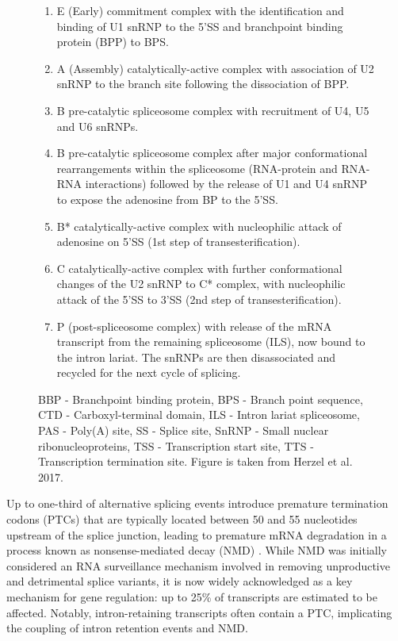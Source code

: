 \begin{figure}[!htp]
{\begin{enumerate}
			\item E (Early) commitment complex with the identification and binding of U1 snRNP to the 5'SS and branchpoint binding protein (BPP) to BPS.
			\item A (Assembly) catalytically-active complex with association of U2 snRNP to the branch site following the dissociation of BPP. 
			\item B pre-catalytic spliceosome complex with recruitment of U4, U5 and U6 snRNPs.
			\item B pre-catalytic spliceosome complex after major conformational rearrangements within the spliceosome (RNA-protein and RNA-RNA interactions) followed by the release of U1 and U4 snRNP to expose the adenosine from BP to the 5'SS. 
			\item B* catalytically-active complex with nucleophilic attack of adenosine on 5'SS (1st step of transesterification). 
			\item C catalytically-active complex with further conformational changes of the U2 snRNP to C* complex, with nucleophilic attack of the 5'SS to 3'SS (2nd step of transesterification). 
			\item P (post-spliceosome complex) with release of the mRNA transcript from the remaining spliceosome (ILS), now bound to the intron lariat. The snRNPs are then disassociated and recycled for the next cycle of splicing.
			\\
		\end{enumerate} 
		BBP - Branchpoint binding protein, BPS - Branch point sequence, CTD - Carboxyl-terminal domain, ILS - Intron lariat spliceosome, PAS - Poly(A) site, SS - Splice site, SnRNP - Small nuclear ribonucleoproteins, TSS - Transcription start site, TTS - Transcription termination site. Figure is taken from Herzel et al. 2017\cite{Herzel2017}.
	}
	\label{fig:AS_mechanism}
\end{figure}

\newpage
{}
Up to one-third of alternative splicing events introduce premature termination codons (PTCs) that are typically located between 50 and 55 nucleotides upstream of the splice junction, leading to premature mRNA degradation in a process known as nonsense-mediated decay (NMD)\cite{Lewis2003} . While NMD was initially considered an RNA surveillance mechanism involved in removing unproductive and detrimental splice variants, it is now widely acknowledged as a key mechanism for gene regulation\cite{Nickless2017}: up to 25\% of transcripts are estimated to be affected\cite{Weischenfeldt2012}. Notably, intron-retaining transcripts often contain a PTC, implicating the coupling of intron retention events and NMD\cite{Wong2013}.     

